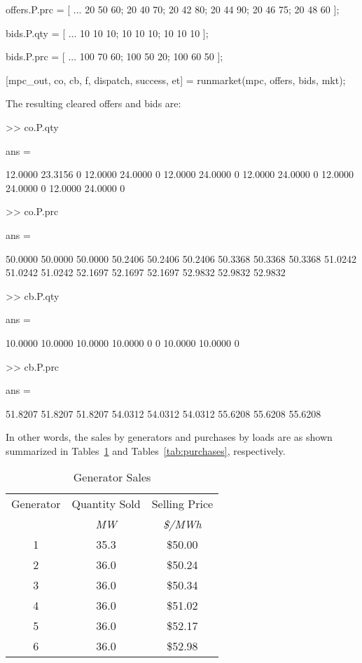 \documentclass[12pt]{article}
\numberwithin{equation}{section}
\numberwithin{table}{section}
\numberwithin{figure}{section}
\begin{document}
\begin{appendices}
\begin{Code}
offers.P.prc = [ ...
	20 50 60;
	20 40 70;
	20 42 80;
	20 44 90;
	20 46 75;
	20 48 60 ];

bids.P.qty = [ ...
	10 10 10;
	10 10 10;
	10 10 10 ];
	
bids.P.prc = [ ...
	100 70 60;
	100 50 20;
	100 60 50 ];

[mpc_out, co, cb, f, dispatch, success, et] = runmarket(mpc, offers, bids, mkt);
\end{Code}
\pagebreak
\noindent
The resulting cleared offers and bids are:
\begin{Code}
>> co.P.qty

ans =

   12.0000   23.3156         0
   12.0000   24.0000         0
   12.0000   24.0000         0
   12.0000   24.0000         0
   12.0000   24.0000         0
   12.0000   24.0000         0
 
>> co.P.prc

ans =

   50.0000   50.0000   50.0000
   50.2406   50.2406   50.2406
   50.3368   50.3368   50.3368
   51.0242   51.0242   51.0242
   52.1697   52.1697   52.1697
   52.9832   52.9832   52.9832

>> cb.P.qty

ans =

   10.0000   10.0000   10.0000
   10.0000         0         0
   10.0000   10.0000         0

>> cb.P.prc

ans =

   51.8207   51.8207   51.8207
   54.0312   54.0312   54.0312
   55.6208   55.6208   55.6208
\end{Code}

\pagebreak
In other words, the sales by generators and purchases by loads are as shown summarized in Tables~\ref{tab:sales} and Tables~\ref{tab:purchases}, respectively.

\begin{table}[!ht]
\centering
\begin{threeparttable}
\caption{Generator Sales}
\label{tab:sales}
\footnotesize
\begin{tabular}{ccc}
\toprule
Generator & Quantity Sold & Selling Price \\
 & {\footnotesize \it MW} & {\footnotesize \it \$/MWh} \\
\midrule
1	& 35.3	& \$50.00 \\
2	& 36.0	& \$50.24 \\
3	& 36.0	& \$50.34 \\
4	& 36.0	& \$51.02 \\
5	& 36.0	& \$52.17 \\
6	& 36.0	& \$52.98 \\
\bottomrule
\end{tabular}
\end{threeparttable}
\end{table}


\end{appendices}
\end{document}
